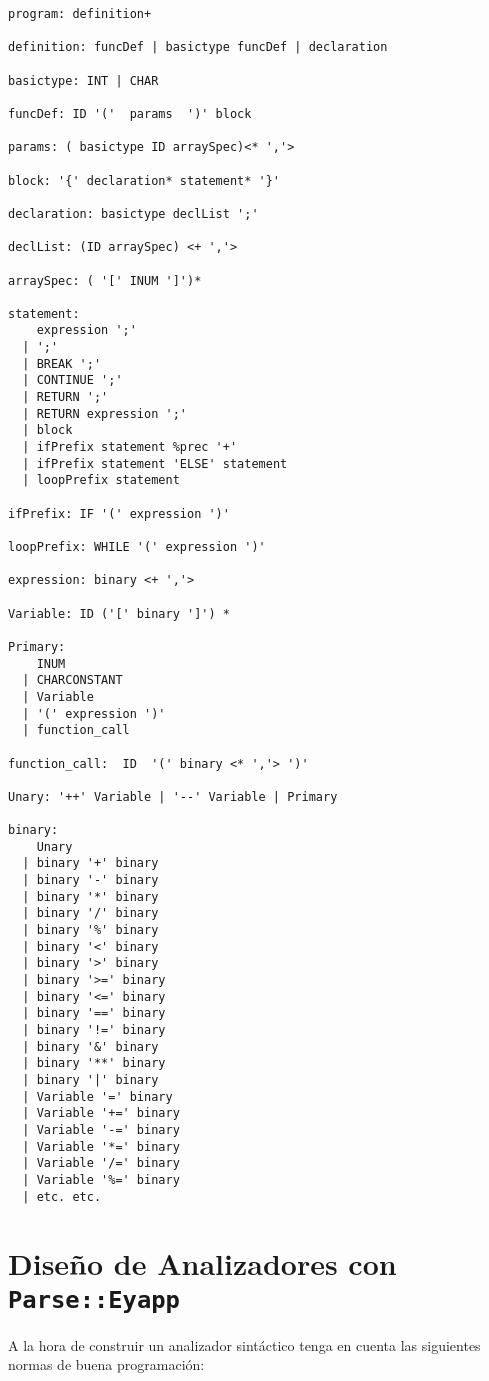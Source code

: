 \begin{verbatim}
program: definition+

definition: funcDef | basictype funcDef | declaration

basictype: INT | CHAR

funcDef: ID '('  params  ')' block

params: ( basictype ID arraySpec)<* ','>

block: '{' declaration* statement* '}'

declaration: basictype declList ';'

declList: (ID arraySpec) <+ ','>

arraySpec: ( '[' INUM ']')*

statement:
    expression ';'
  | ';'
  | BREAK ';'
  | CONTINUE ';'
  | RETURN ';'
  | RETURN expression ';'
  | block
  | ifPrefix statement %prec '+'
  | ifPrefix statement 'ELSE' statement
  | loopPrefix statement

ifPrefix: IF '(' expression ')'

loopPrefix: WHILE '(' expression ')'

expression: binary <+ ','>

Variable: ID ('[' binary ']') *

Primary:
    INUM
  | CHARCONSTANT
  | Variable
  | '(' expression ')'
  | function_call

function_call:  ID  '(' binary <* ','> ')'

Unary: '++' Variable | '--' Variable | Primary

binary:
    Unary
  | binary '+' binary
  | binary '-' binary
  | binary '*' binary
  | binary '/' binary
  | binary '%' binary
  | binary '<' binary
  | binary '>' binary
  | binary '>=' binary
  | binary '<=' binary
  | binary '==' binary
  | binary '!=' binary
  | binary '&' binary
  | binary '**' binary
  | binary '|' binary
  | Variable '=' binary
  | Variable '+=' binary
  | Variable '-=' binary
  | Variable '*=' binary
  | Variable '/=' binary
  | Variable '%=' binary
  | etc. etc.
\end{verbatim}

\section{Diseño de Analizadores con {\tt Parse::Eyapp}}
\label{section:consejoseyapp}
A la hora de construir un analizador sintáctico tenga en cuenta 
las siguientes normas de buena programación:

